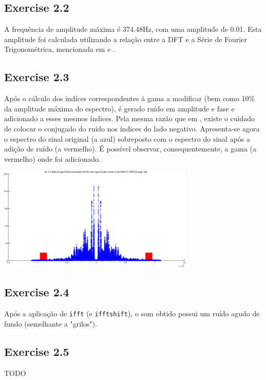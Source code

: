 \documentclass[a4paper]{article}
\begin{document}
\subsection{Exercise 2.2}
\noindent A frequência de amplitude máxima é 374.48Hz, com uma amplitude de 0.01. Esta amplitude foi calculada utilizando a relação entre a DFT e a Série de Fourier Trigonométrica, mencionada em \emph{} e \emph{}.

\subsection{Exercise 2.3}
\noindent Após o cálculo dos indíces correspondentes à gama a modificar (bem como 10\% da amplitude máxima do espectro), é gerado ruído em amplitude e fase e adicionado a esses mesmos índices. Pela mesma razão que em \emph{}, existe o cuidado de colocar o conjugado do ruído nos índices do lado negativo. Apresenta-se agora o espectro do sinal original (a azul) sobreposto com o espectro do sinal após a adição de ruído (a vermelho). É possível observar, consequentemente, a gama (a vermelho) onde foi adicionado.
\begin{center}
	\includegraphics[width=0.70\textwidth]{images/ex_2_3_lowpass.png}
	\label{fig:ex_2_1}
\end{center}

\subsection{Exercise 2.4}
\noindent Após a aplicação de \texttt{ifft} (e \texttt{ifftshift}), o som obtido possui um ruído agudo de fundo (semelhante a "grilos").

\subsection{Exercise 2.5}
\noindent TODO
\end{document}

